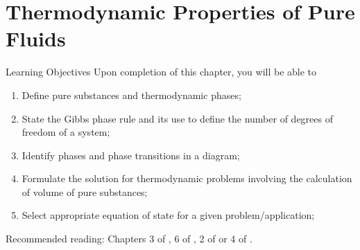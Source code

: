 \chapter{Thermodynamic Properties of Pure Fluids}\label{Chapter:ThermodynamicPropertiesPureFluids}

   \begin{LearningObjectivesBlock}{Learning Objectives}
      Upon completion of this chapter, you will be able to
        \begin{enumerate}
           \item Define pure substances and thermodynamic phases;
           \item State the Gibbs phase rule and its use to define the number of degrees of freedom of a system;
           \item Identify phases and phase transitions in a diagram;
           \item Formulate the solution for thermodynamic problems involving the calculation of volume of pure substances;
           \item Select appropriate equation of state for a given problem/application;
        \end{enumerate}
\medskip
     Recommended reading: Chapters 3 of \citet{SmithVanNess_Book}, 6 of \citet{Sandler_Book}, 2 of \citet{Borgnakke_Book} or 4 of \citet{Atkins_Book}.
   \end{LearningObjectivesBlock}


\begin{comment}
   \begin{LearningObjectivesBlock}{Learning Objectives}
      Upon completion of this chapter, you will be able to
        \begin{enumerate}
           \item {\bf Knowledge:} Define, Name, Select, State 
           \item {\bf Comprehension:} Describe, Identify, Discuss
           \item {\bf Application:} Apply, Demonstrate, Employ, Sketch
           \item {\bf Analysis:} Analyse, Compare, Calculate, Solve
           \item {\bf Synthesis:} Determine, Formulate
           \item {\bf Evaluation:} Assess, Check, Estimate, Compare, Measure, Monitor
        \end{enumerate}
\end{comment}

